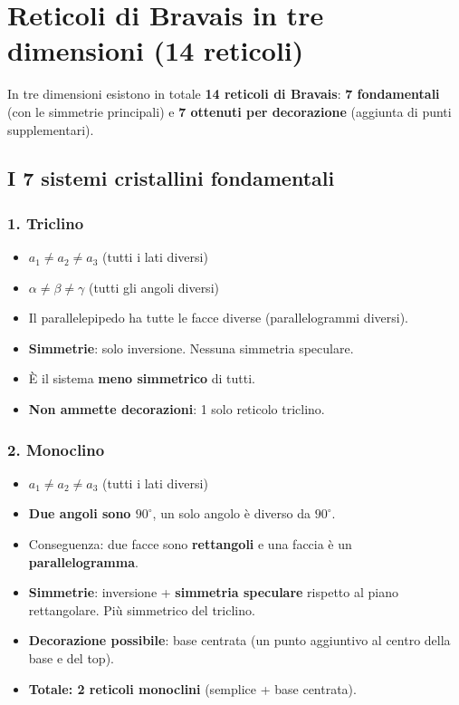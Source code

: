 \section{Reticoli di Bravais in tre dimensioni (14 reticoli)}

In tre dimensioni esistono in totale \textbf{14 reticoli di Bravais}: \textbf{7 fondamentali} (con le simmetrie principali) e \textbf{7 ottenuti per decorazione} (aggiunta di punti supplementari).

\subsection*{I 7 sistemi cristallini fondamentali}

\subsubsection{1. Triclino}
\begin{itemize}
    \item $a_1 \neq a_2 \neq a_3$ (tutti i lati diversi)
    \item $\alpha \neq \beta \neq \gamma$ (tutti gli angoli diversi)
    \item Il parallelepipedo ha tutte le facce diverse (parallelogrammi diversi).
    \item \textbf{Simmetrie}: solo inversione. Nessuna simmetria speculare.
    \item È il sistema \textbf{meno simmetrico} di tutti.
    \item \textbf{Non ammette decorazioni}: 1 solo reticolo triclino.
\end{itemize}

\subsubsection{2. Monoclino}
\begin{itemize}
    \item $a_1 \neq a_2 \neq a_3$ (tutti i lati diversi)
    \item \textbf{Due angoli sono $90^\circ$}, un solo angolo è diverso da $90^\circ$.
    \item Conseguenza: due facce sono \textbf{rettangoli} e una faccia è un \textbf{parallelogramma}.
    \item \textbf{Simmetrie}: inversione + \textbf{simmetria speculare} rispetto al piano rettangolare. Più simmetrico del triclino.
    \item \textbf{Decorazione possibile}: base centrata (un punto aggiuntivo al centro della base e del top).
    \item \textbf{Totale: 2 reticoli monoclini} (semplice + base centrata).
\end{itemize}


